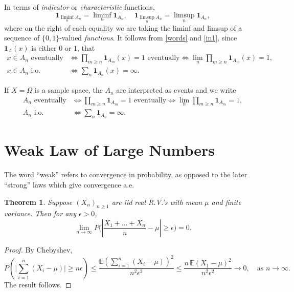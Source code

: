 \documentclass[a4paper]{amsart}
\theoremstyle{plain}
\newtheorem{theorem}{Theorem}[section]
\theoremstyle{definition}
\theoremstyle{remark}
\begin{document}
 
\bigskip
  In terms of \emph{indicator} or \emph{characteristic} functions,
\begin{equation} \label{in1} 
\boldsymbol{1}_{\liminf_n A_n } = \liminf_n  \boldsymbol{1}_{A_n}, \quad 
\boldsymbol{1}_{\limsup_n A_n } = \limsup_n  \boldsymbol{1}_{A_n},  
\end{equation} 
where on the right of each equality we are taking the liminf and limsup of a sequence of $ \{0,1\} $-valued \emph{functions}.
 It follows from \eqref{words} and \eqref{in1}, since $ \boldsymbol{1}_A(x) $ is either $ 0 $ or $ 1 $, that 
\begin{align} 
  x \in A_n \text{ eventually} &\Longleftrightarrow 
            \prod_{m\geq n } \boldsymbol{1} _{A_m}(x) = 1   \text{ eventually}           \Longleftrightarrow 
            \lim_{n} \prod_{m\geq n }  \boldsymbol{1} _{A_m}(x) = 1, \label{in2}\\
  x \in A_n \text{ i.o.} &\Longleftrightarrow 
           \sum_n   \boldsymbol{1} _{A_n}(x) = \infty     \label{in3} .      
 \end{align} 

\bigskip 
If $ X=\Omega $ is a sample space, the $ A_n $ are interpreted as events and we write 
\begin{align} 
   A_n \text{ eventually} &\Longleftrightarrow 
            \prod_{m\geq n } \boldsymbol{1} _{A_m} = 1   \text{ eventually}           \Longleftrightarrow 
            \lim_{n} \prod_{m\geq n }  \boldsymbol{1} _{A_m}  = 1, \label{ins2}\\
 A_n \text{ i.o.} &\Longleftrightarrow 
           \sum_n   \boldsymbol{1} _{A_n}  = \infty     \label{ins3} .      
 \end{align} 

\section{Weak Law of Large Numbers}  The word ``weak'' refers to convergence in probability, as opposed to the later ``strong'' laws  which give convergence a.e.

\begin{theorem} Suppose $ (X_n)_{n\geq 1} $ are iid real R.V.'s with mean $ \mu $ and finite variance.  Then for any $ \epsilon > 0 $, 
\[
\lim_{n \to \infty} P \Bigg( \left| \frac{X_1 + \dots + X_n}{n} - \mu  \right| \geq \epsilon \Bigg) = 0 .
\]
\end{theorem}


\begin{proof} 
By Chebyshev,
\[
P\left( \bigg| \sum_{i=1}^n (X_i - \mu) \bigg| \geq n \epsilon \right) 
\leq \frac{ \mathbb{E} \left( \sum_{i=1}^n (X_i - \mu )\right)^2} { n^2 \epsilon ^2 } 
   \leq \frac{ n\,  \mathbb{E} (X_1-\mu)^2   } { n^2 \epsilon ^2 } \to 0, \quad \text{as } n\to \infty.
   \]
The result follows.
   \end{proof} 
\end{document}
